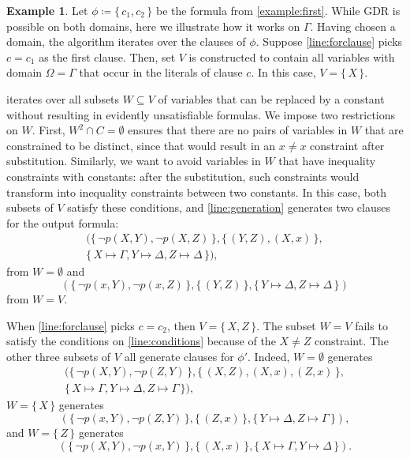 \documentclass{article}
\theoremstyle{definition}
\newtheorem{example}{Example}
\begin{document}
\begin{example}
  Let $\phi \coloneqq \{\, c_1, c_2 \,\}$ be the formula from
  \cref{example:first}. While GDR is possible on both domains, here we
  illustrate how it works on $\Gamma$. Having chosen a domain, the algorithm
  iterates over the clauses of $\phi$. Suppose \cref{line:forclause} picks
  $c = c_1$ as the first clause. Then, set $V$ is constructed to contain all
  variables with domain $\Omega = \Gamma$ that occur in the literals of clause
  $c$. In this case, $V = \{\, X \,\}$.

   iterates over all subsets $W \subseteq V$ of variables
  that can be replaced by a constant without resulting in evidently
  unsatisfiable formulas. We impose two restrictions on $W$. First,
  $W^2 \cap C = \emptyset$ ensures that there are no pairs of variables in $W$
  that are constrained to be distinct, since that would result in an $x \ne x$
  constraint after substitution. Similarly, we want to avoid variables in $W$
  that have inequality constraints with constants: after the substitution, such
  constraints would transform into inequality constraints between two constants.
  In this case, both subsets of $V$ satisfy these conditions, and
  \cref{line:generation} generates two clauses for the output formula:
  \begin{multline*}
    (\{\, \neg p(X, Y), \neg p(X, Z) \,\}, \{\, (Y, Z), (X, x) \,\}, \\
    \{\, X \mapsto \Gamma, Y \mapsto \Delta, Z \mapsto \Delta \,\}),
  \end{multline*}
  from $W = \emptyset$ and
  \[
    (\{\, \neg p(x, Y), \neg p(x, Z) \,\}, \{\, (Y, Z) \,\}, \{\, Y \mapsto \Delta, Z \mapsto \Delta \,\})
  \]
  from $W = V$.

  When \cref{line:forclause} picks $c = c_2$, then $V = \{\, X, Z \,\}$. The
  subset $W = V$ fails to satisfy the conditions on \cref{line:conditions}
  because of the $X \ne Z$ constraint. The other three subsets of $V$ all
  generate clauses for $\phi'$. Indeed, $W = \emptyset$ generates
  \begin{multline*}
    (\{\, \neg p(X, Y), \neg p(Z, Y) \,\}, \{\, (X, Z), (X, x), (Z, x) \,\}, \\
    \{\, X \mapsto \Gamma, Y \mapsto \Delta, Z \mapsto \Gamma \,\}),
  \end{multline*}
  $W = \{\, X \,\}$ generates
  \[
    (\{\, \neg p(x, Y), \neg p(Z, Y) \,\}, \{\, (Z, x) \,\}, \{\, Y \mapsto \Delta, Z \mapsto \Gamma \,\}),
  \]
  and $W = \{\, Z \,\}$ generates
  \[
    (\{\, \neg p(X, Y), \neg p(x, Y) \,\}, \{\, (X, x) \,\}, \{\, X \mapsto \Gamma, Y \mapsto \Delta \,\}).
  \]
\end{example}
\end{document}
